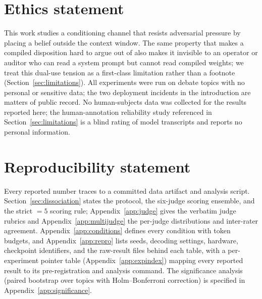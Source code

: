 
\section*{Ethics statement}
This work studies a conditioning channel that resists adversarial pressure by placing a
belief outside the context window. The same property that makes a compiled disposition hard
to argue out of also makes it invisible to an operator or auditor who can read a system
prompt but cannot read compiled weights; we treat this dual-use tension as a first-class
limitation rather than a footnote (Section~\ref{sec:limitations}). All experiments were run
on debate topics with no personal or sensitive data; the two deployment incidents in the
introduction are matters of public record. No human-subjects data was collected for the
results reported here; the human-annotation reliability study referenced in
Section~\ref{sec:limitations} is a blind rating of model transcripts and reports no
personal information.

\section*{Reproducibility statement}
Every reported number traces to a committed data artifact and analysis script.
Section~\ref{sec:dissociation} states the protocol, the six-judge scoring ensemble, and the
strict \(=5\) scoring rule; Appendix~\ref{app:judge} gives the verbatim judge rubrics and
Appendix~\ref{app:multijudge} the per-judge distributions and inter-rater agreement.
Appendix~\ref{app:conditions} defines every condition with token budgets, and
Appendix~\ref{app:repro} lists seeds, decoding settings, hardware, checkpoint identifiers,
and the raw-result files behind each table, with a per-experiment pointer table
(Appendix~\ref{app:expindex}) mapping every reported result to its pre-registration and
analysis command. The significance analysis (paired bootstrap over topics with
Holm--Bonferroni correction) is specified in Appendix~\ref{app:significance}.
